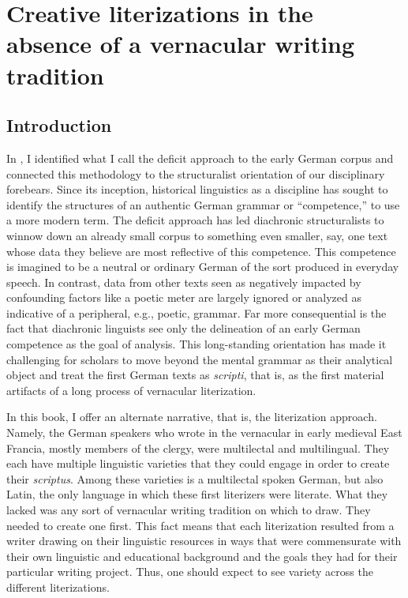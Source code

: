 \chapter{Creative literizations in the absence of a vernacular writing tradition}\label{sec:chap:3}

\section{Introduction}
In , I identified what I call the deficit approach to the early German corpus and connected this methodology to the structuralist orientation of our disciplinary forebears. Since its inception, historical linguistics as a discipline has sought to identify the structures of an authentic German grammar or “competence,” to use a more modern term. The deficit approach has led diachronic structuralists to winnow down an already small corpus to something even smaller, say, one text whose data they believe are most reflective of this competence. This competence is imagined to be a neutral or ordinary German of the sort produced in everyday speech. In contrast, data from other texts seen as negatively impacted by confounding factors like a poetic meter are largely ignored or analyzed as indicative of a peripheral, e.g., poetic, grammar. Far more consequential is the fact that diachronic linguists see only the delineation of an early German competence as the goal of analysis. This long-standing orientation has made it challenging for scholars to move beyond the mental grammar as their analytical object and treat the first German texts as \textit{scripti}, that is, as the first material artifacts of a long process of vernacular literization.

  In this book, I offer an alternate narrative, that is, the literization approach. Namely, the German speakers who wrote in the vernacular in early medieval East Francia, mostly members of the clergy, were multilectal and multilingual. They each have multiple linguistic varieties that they could engage in order to create their \textit{scriptus}. Among these varieties is a multilectal spoken German, but also Latin, the only language in which these first literizers were literate. What they lacked was any sort of vernacular writing tradition on which to draw. They needed to create one first. This fact means that each literization resulted from a writer drawing on their linguistic resources in ways that were commensurate with their own linguistic and educational background and the goals they had for their particular writing project. Thus, one should expect to see variety across the different literizations.

